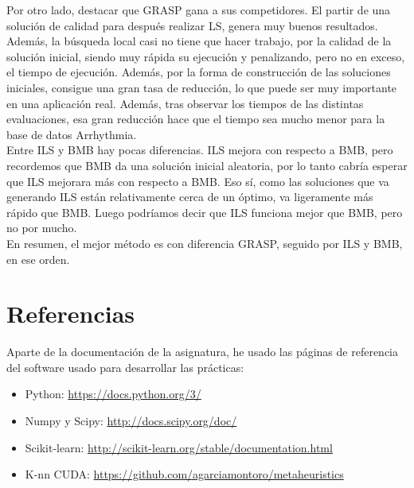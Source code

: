Por otro lado, destacar que GRASP gana a sus competidores. El partir de una solución de calidad para después realizar LS, genera muy buenos resultados. Además, la búsqueda local casi no tiene que hacer trabajo, por la calidad de la solución inicial, siendo muy rápida su ejecución y penalizando, pero no en exceso, el tiempo de ejecución. Además, por la forma de construcción de las soluciones iniciales, consigue una gran tasa de reducción, lo que puede ser muy importante en una aplicación real. Además, tras observar los tiempos de las distintas evaluaciones, esa gran reducción hace que el tiempo sea mucho menor para la base de datos Arrhythmia.\\

Entre ILS y BMB hay pocas diferencias. ILS mejora con respecto a BMB, pero recordemos que BMB da una solución inicial aleatoria, por lo tanto cabría esperar que ILS mejorara más con respecto a BMB. Eso sí, como las soluciones que va generando ILS están relativamente cerca de un óptimo, va ligeramente más rápido que BMB. Luego podríamos decir que ILS funciona mejor que BMB, pero no por mucho.\\

En resumen, el mejor método es con diferencia GRASP, seguido por ILS y BMB, en ese orden.\\

\newpage
\section{Referencias}
Aparte de la documentación de la asignatura, he usado las páginas de referencia del software usado para desarrollar las prácticas:
\begin{itemize}
\item Python:  \url{https://docs.python.org/3/}
\item Numpy y Scipy: \url{http://docs.scipy.org/doc/}
\item Scikit-learn: \url{http://scikit-learn.org/stable/documentation.html}
\item K-nn CUDA: \url{https://github.com/agarciamontoro/metaheuristics}
\end{itemize}
\newpage

